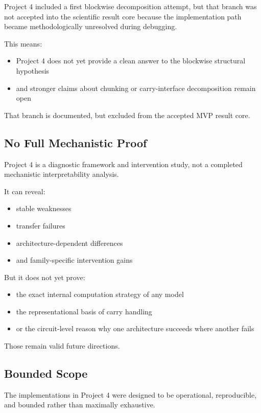 \documentclass[11pt]{article}
\begin{document}
Project 4 included a first blockwise decomposition attempt, but that branch was not accepted into the scientific result core because the implementation path became methodologically unresolved during debugging.

This means:
\begin{itemize}[leftmargin=1.5em]
    \item Project 4 does not yet provide a clean answer to the blockwise structural hypothesis
    \item and stronger claims about chunking or carry-interface decomposition remain open
\end{itemize}

That branch is documented, but excluded from the accepted MVP result core.

\subsection{No Full Mechanistic Proof}

Project 4 is a diagnostic framework and intervention study, not a completed mechanistic interpretability analysis.

It can reveal:
\begin{itemize}[leftmargin=1.5em]
    \item stable weaknesses
    \item transfer failures
    \item architecture-dependent differences
    \item and family-specific intervention gains
\end{itemize}

But it does not yet prove:
\begin{itemize}[leftmargin=1.5em]
    \item the exact internal computation strategy of any model
    \item the representational basis of carry handling
    \item or the circuit-level reason why one architecture succeeds where another fails
\end{itemize}

Those remain valid future directions.

\subsection{Bounded Scope}

The implementations in Project 4 were designed to be operational, reproducible, and bounded rather than maximally exhaustive.
\end{document}
